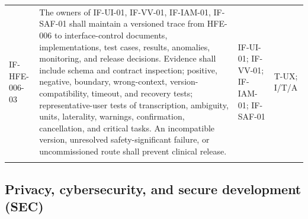 \documentclass[11pt,letterpaper]{article}
\begin{document}
\begin{scriptsize}
\begin{longtable}{@{}L{0.14\textwidth}L{0.49\textwidth}L{0.19\textwidth}L{0.10\textwidth}@{}}
\addlinespace[2pt]
\mbox{IF-HFE-006-03} & The owners of IF-UI-01, IF-VV-01, IF-IAM-01, IF-SAF-01 shall maintain a versioned trace from HFE-006 to interface-control documents, implementations, test cases, results, anomalies, monitoring, and release decisions. Evidence shall include schema and contract inspection; positive, negative, boundary, wrong-context, version-compatibility, timeout, and recovery tests; representative-user tests of transcription, ambiguity, units, laterality, warnings, confirmation, cancellation, and critical tasks. An incompatible version, unresolved safety-significant failure, or uncommissioned route shall prevent clinical release. & IF-UI-01; IF-VV-01; IF-IAM-01; IF-SAF-01 & T-UX; I\slash\allowbreak{}T\slash\allowbreak{}A \\
\addlinespace[2pt]
\end{longtable}
\end{scriptsize}

\subsection{Privacy, cybersecurity, and secure development (SEC)}
\end{document}

